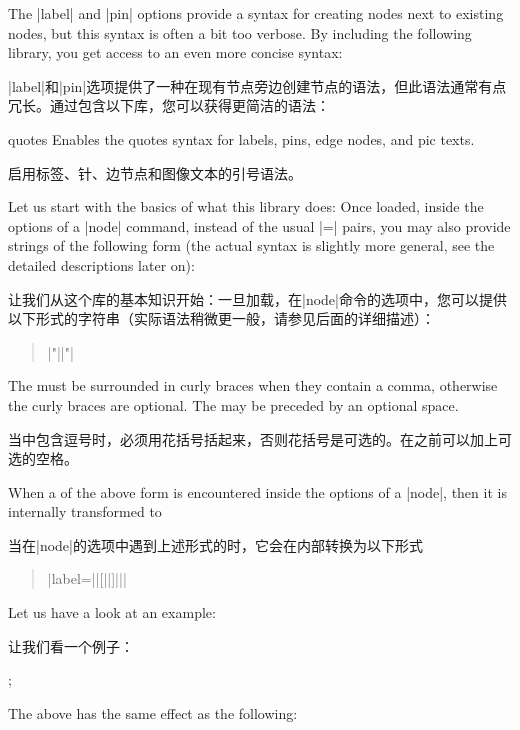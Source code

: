 The |label| and |pin| options provide a syntax for creating nodes next to
existing nodes, but this syntax is often a bit too verbose. By including the
following library, you get access to an even more concise syntax:

|label|和|pin|选项提供了一种在现有节点旁边创建节点的语法，但此语法通常有点冗长。通过包含以下库，您可以获得更简洁的语法：

\begin{tikzlibrary}{quotes}
    Enables the quotes syntax for labels, pins, edge nodes, and pic texts.

    启用标签、针、边节点和图像文本的引号语法。
\end{tikzlibrary}

Let us start with the basics of what this library does: Once loaded, inside the
options of a |node| command, instead of the usual |=|
pairs, you may also provide strings of the following form (the actual syntax is
slightly more general, see the detailed descriptions later on):

让我们从这个库的基本知识开始：一旦加载，在|node|命令的选项中，您可以提供以下形式的字符串（实际语法稍微更一般，请参见后面的详细描述）：

\begin{quote}
    |"||"|
\end{quote}
%
The  must be surrounded in curly braces when they contain a
comma, otherwise the curly braces are optional. The  may be
preceded by an optional space.

当中包含逗号时，必须用花括号括起来，否则花括号是可选的。在之前可以加上可选的空格。

When a  of the above form is encountered inside the options of a
|node|, then it is internally transformed to

当在|node|的选项中遇到上述形式的时，它会在内部转换为以下形式
%


\begin{quote}
    |label=||{[||]||}|
\end{quote}

Let us have a look at an example:

让我们看一个例子：

\begin{codeexample}[preamble={\usetikzlibrary{quotes}}]
\tikz {};
\end{codeexample}
%
The above has the same effect as the following:

